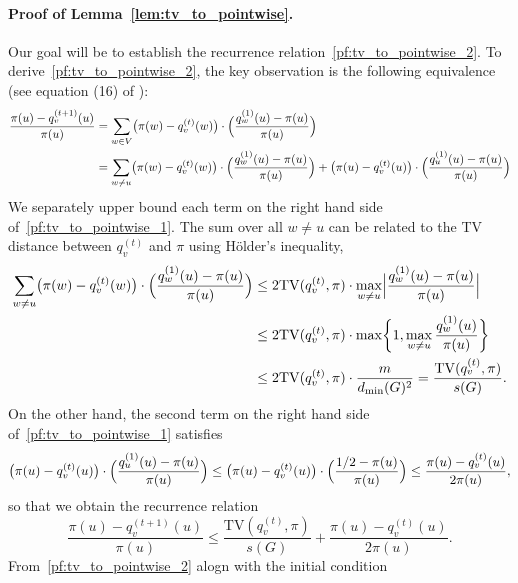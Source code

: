 \paragraph{Proof of Lemma~\ref{lem:tv_to_pointwise}.}
	Our goal will be to establish the recurrence relation~\eqref{pf:tv_to_pointwise_2}. 
	To derive~\eqref{pf:tv_to_pointwise_2}, the key observation is the following equivalence (see equation (16) of \citep{morris2005}):
	\begin{align}
	\label{pf:tv_to_pointwise_1}
	\frac{\pi(u) - q_v^{(t + 1)}(u)}{\pi(u)} & = \sum_{w \in V} \bigl(\pi(w) - q_v^{(t)}(w) \bigr) \cdot \Bigl(\frac{q_w^{(1)}(u) - \pi(u)}{\pi(u)}\Bigr) \nonumber \\
	& = \sum_{w \neq u} \bigl(\pi(w) - q_v^{(t)}(w) \bigr) \cdot \Bigl(\frac{q_w^{(1)}(u) - \pi(u)}{\pi(u)}\Bigr) + \bigl(\pi(u) - q_v^{(t)}(u) \bigr) \cdot \Bigl(\frac{q_u^{(1)}(u) - \pi(u)}{\pi(u)}\Bigr)
	\end{align}
	We separately upper bound each term on the right hand side of~\eqref{pf:tv_to_pointwise_1}. The sum over all $w \neq u$ can be related to the TV distance between $q_v^{(t)}$ and $\pi$ using H{\"o}lder's inequality,
	\begin{align*}
	\sum_{w \neq u} \bigl(\pi(w) - q_v^{(t)}(w) \bigr) \cdot \Bigl(\frac{q_w^{(1)}(u) - \pi(u)}{\pi(u)}\Bigr) & \leq 2\mathrm{TV}(q_v^{(t)},\pi) \cdot \max_{w \neq u}\Bigl|\frac{q_w^{(1)}(u) - \pi(u)}{\pi(u)}\Bigr| \\
	& \leq 2\mathrm{TV}(q_v^{(t)},\pi) \cdot \max\biggl\{1, \max_{w \neq u} \frac{q_w^{(1)}(u)}{\pi(u)} \biggr\} \\
	& \leq 2\mathrm{TV}(q_v^{(t)},\pi) \cdot \frac{m}{d_{\min}(G)^2} = \frac{\mathrm{TV}(q_v^{(t)},\pi) }{s(G)}.
	\end{align*}
	On the other hand, the second term on the right hand side of~\eqref{pf:tv_to_pointwise_1} satisfies
	\begin{align*}
	\bigl(\pi(u) - q_v^{(t)}(u) \bigr) \cdot \Bigl(\frac{q_u^{(1)}(u) - \pi(u)}{\pi(u)}\Bigr) \leq \bigl(\pi(u) - q_v^{(t)}(u) \bigr) \cdot \Bigl(\frac{1/2 - \pi(u)}{\pi(u)}\Bigr) \leq \frac{\pi(u) - q_v^{(t)}(u)}{2\pi(u)},
	\end{align*}
	so that we obtain the recurrence relation
	\begin{equation}
	\label{pf:tv_to_pointwise_2}
	\frac{\pi(u) - q_v^{(t + 1)}(u)}{\pi(u)} \leq \frac{\mathrm{TV}(q_v^{(t)},\pi) }{s(G)} +\frac{\pi(u) - q_v^{(t)}(u)}{2\pi(u)}.
	\end{equation}
	From~\eqref{pf:tv_to_pointwise_2} alogn with the initial condition
